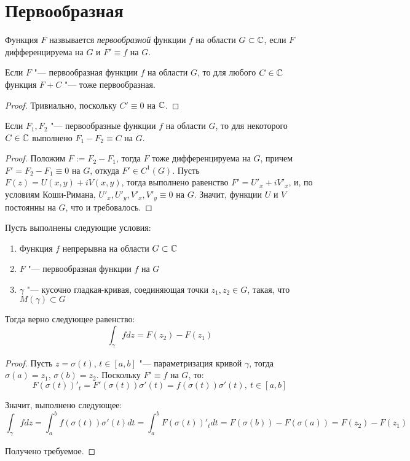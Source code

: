 \section{Первообразная}

\begin{definition}
	Функция $F$ назвывается \textit{первообразной} функции $f$ на области $G \subset \mathbb{C}$, если $F$ дифференцируема на $G$ и $F' \equiv f$ на $G$.
\end{definition}

\begin{note}
	Если $F$ "--- первообразная функции $f$ на области $G$, то для любого $C \in \mathbb{C}$ функция $F + C$ "--- тоже первообразная.
\end{note}

\begin{proof}
	Тривиально, поскольку $C' \equiv 0$ на $\mathbb{C}$.
\end{proof}

\begin{proposition}
	Если $F_1, F_2$ "--- первообразные функции $f$ на области $G$, то для некоторого $C \in \mathbb{C}$ выполнено $F_1 - F_2 \equiv C$ на $G$.
\end{proposition}

\begin{proof}
	Положим $F := F_2 - F_1$, тогда $F$ тоже дифференцируема на $G$, причем $F' = F_2 - F_1 \equiv 0$ на $G$, откуда $F' \in C^1(G)$. Пусть $F(z) = U(x, y) + iV(x, y)$, тогда выполнено равенство $F' = U'_x +iV'_x$, и, по условиям Коши-Римана, $U'_x, U'_y, V'_x, V'_y \equiv 0$ на $G$. Значит, функции $U$ и $V$ постоянны на $G$, что и требовалось.
\end{proof}

\begin{proposition}
	Пусть выполнены следующие условия:
	\begin{enumerate}
		\item Функция $f$ непрерывна на области $G \subset \mathbb{C}$
		\item $F$ "--- первообразная функции $f$ на $G$
		\item $\gamma$ "--- кусочно гладкая-кривая, соединяющая точки $z_1, z_2 \in G$, такая, что $M(\gamma) \subset G$
	\end{enumerate}
	
	Тогда верно следующее равенство:
	\[\int_{\gamma}fdz = F(z_2) - F(z_1)\]
\end{proposition}

\begin{proof}
	Пусть $z = \sigma(t)$, $t \in [a, b]$ "--- параметризация кривой $\gamma$, тогда $\sigma(a) = z_1$, $\sigma(b) = z_2$. Поскольку $F' \equiv f$ на $G$, то:
	\[F(\sigma(t))'_t = F'(\sigma(t))\sigma'(t) = f(\sigma(t))\sigma'(t),~t \in [a, b]\]
	
	Значит, выполнено следующее:
	\[\int_\gamma fdz = \int_a^b f(\sigma(t))\sigma'(t)dt = \int_a^b F(\sigma(t))'_t dt = F(\sigma(b)) - F(\sigma(a)) = F(z_2) - F(z_1)\]
	
	Получено требуемое.
\end{proof}

